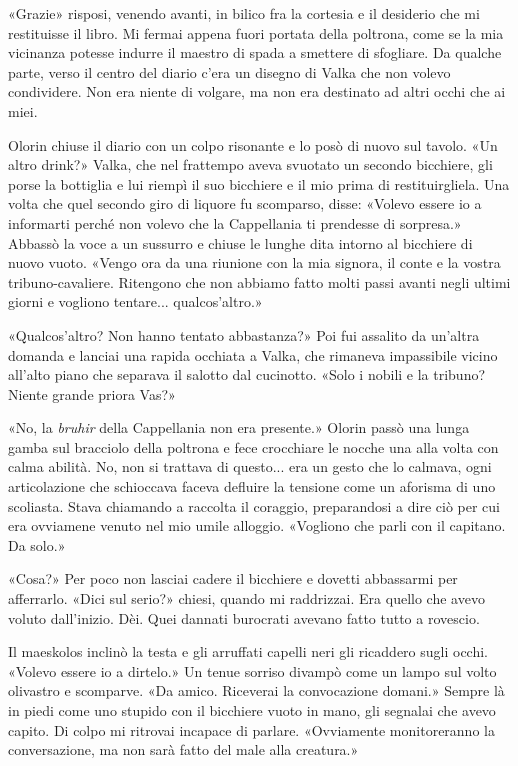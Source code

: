 «Grazie» risposi, venendo avanti, in bilico fra la cortesia e il
desiderio che mi restituisse il libro. Mi fermai appena fuori portata
della poltrona, come se la mia vicinanza potesse indurre il maestro di
spada a smettere di sfogliare. Da qualche parte, verso il centro del
diario c'era un disegno di Valka che non volevo condividere. Non era
niente di volgare, ma non era destinato ad altri occhi che ai miei.

Olorin chiuse il diario con un colpo risonante e lo posò di nuovo sul
tavolo. «Un altro drink?» Valka, che nel frattempo aveva svuotato un
secondo bicchiere, gli porse la bottiglia e lui riempì il suo bicchiere
e il mio prima di restituirgliela. Una volta che quel secondo giro di
liquore fu scomparso, disse: «Volevo essere io a informarti perché non
volevo che la Cappellania ti prendesse di sorpresa.» Abbassò la voce a
un sussurro e chiuse le lunghe dita intorno al bicchiere di nuovo vuoto.
«Vengo ora da una riunione con la mia signora, il conte e la vostra
tribuno-cavaliere. Ritengono che non abbiamo fatto molti passi avanti
negli ultimi giorni e vogliono tentare... qualcos'altro.»

«Qualcos'altro? Non hanno tentato abbastanza?» Poi fui assalito da
un'altra domanda e lanciai una rapida occhiata a Valka, che rimaneva
impassibile vicino all'alto piano che separava il salotto dal cucinotto.
«Solo i nobili e la tribuno? Niente grande priora Vas?»

«No, la \emph{bruhir} della Cappellania non era presente.» Olorin passò
una lunga gamba sul bracciolo della poltrona e fece crocchiare le nocche
una alla volta con calma abilità. No, non si trattava di questo... era
un gesto che lo calmava, ogni articolazione che schioccava faceva
defluire la tensione come un aforisma di uno scoliasta. Stava chiamando
a raccolta il coraggio, preparandosi a dire ciò per cui era ovviamene
venuto nel mio umile alloggio. «Vogliono che parli con il capitano. Da
solo.»

«Cosa?» Per poco non lasciai cadere il bicchiere e dovetti abbassarmi
per afferrarlo. «Dici sul serio?» chiesi, quando mi raddrizzai. Era
quello che avevo voluto dall'inizio. Dèi. Quei dannati burocrati avevano
fatto tutto a rovescio.

Il maeskolos inclinò la testa e gli arruffati capelli neri gli ricaddero
sugli occhi. «Volevo essere io a dirtelo.» Un tenue sorriso divampò come
un lampo sul volto olivastro e scomparve. «Da amico. Riceverai la
convocazione domani.» Sempre là in piedi come uno stupido con il
bicchiere vuoto in mano, gli segnalai che avevo capito. Di colpo mi
ritrovai incapace di parlare. «Ovviamente monitoreranno la
conversazione, ma non sarà fatto del male alla creatura.»

